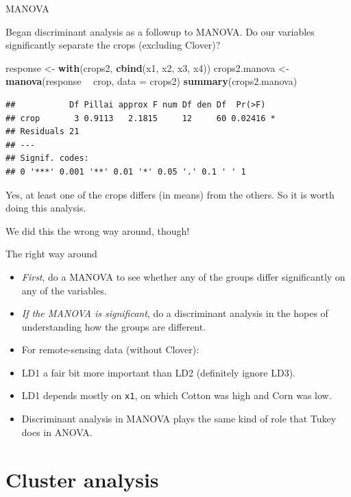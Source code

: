 \documentclass[ignorenonframetext,]{beamer}
\newenvironment{Shaded}{\begin{snugshade}}{\end{snugshade}}
\newcommand{\DataTypeTok}[1]{\textcolor[rgb]{0.13,0.29,0.53}{#1}}
\newcommand{\KeywordTok}[1]{\textcolor[rgb]{0.13,0.29,0.53}{\textbf{#1}}}
\newcommand{\NormalTok}[1]{#1}
\newcommand{\OperatorTok}[1]{\textcolor[rgb]{0.81,0.36,0.00}{\textbf{#1}}}
\newcommand{\StringTok}[1]{\textcolor[rgb]{0.31,0.60,0.02}{#1}}
\begin{document}
\begin{frame}[fragile]{MANOVA}
\protect\hypertarget{manova-1}{}

Began discriminant analysis as a followup to MANOVA. Do our variables
significantly separate the crops (excluding Clover)?

\begin{Shaded}
\begin{Highlighting}[]
\NormalTok{response <-}\StringTok{ }\KeywordTok{with}\NormalTok{(crops2, }\KeywordTok{cbind}\NormalTok{(x1, x2, x3, x4))}
\NormalTok{crops2.manova <-}\StringTok{ }\KeywordTok{manova}\NormalTok{(response }\OperatorTok{~}\StringTok{ }\NormalTok{crop, }\DataTypeTok{data =}\NormalTok{ crops2)}
\KeywordTok{summary}\NormalTok{(crops2.manova)}
\end{Highlighting}
\end{Shaded}

\begin{verbatim}
##           Df Pillai approx F num Df den Df  Pr(>F)  
## crop       3 0.9113   2.1815     12     60 0.02416 *
## Residuals 21                                        
## ---
## Signif. codes:  
## 0 '***' 0.001 '**' 0.01 '*' 0.05 '.' 0.1 ' ' 1
\end{verbatim}

Yes, at least one of the crops differs (in means) from the others. So it
is worth doing this analysis.

We did this the wrong way around, though!

\end{frame}

\begin{frame}[fragile]{The right way around}
\protect\hypertarget{the-right-way-around}{}

\begin{itemize}
\item
  \emph{First}, do a MANOVA to see whether any of the groups differ
  significantly on any of the variables.
\item
  \emph{If the MANOVA is significant}, do a discriminant analysis in the
  hopes of understanding how the groups are different.
\item
  For remote-sensing data (without Clover):
\item
  LD1 a fair bit more important than LD2 (definitely ignore LD3).
\item
  LD1 depends mostly on \texttt{x1}, on which Cotton was high and Corn
  was low.
\item
  Discriminant analysis in MANOVA plays the same kind of role that Tukey
  does in ANOVA.
\end{itemize}

\section{Cluster analysis}
\frame{\sectionpage}

\end{frame}
\end{document}
